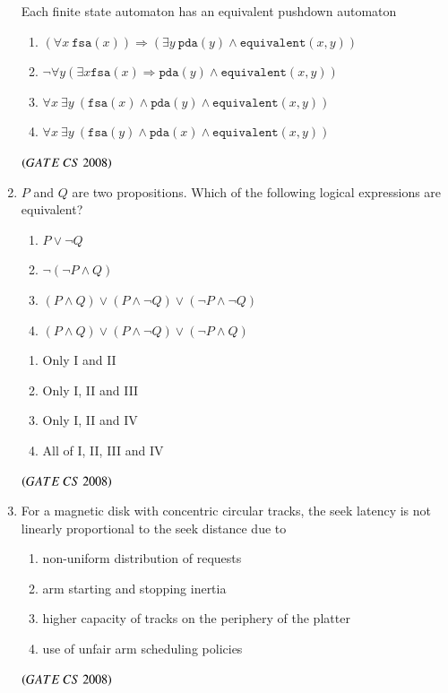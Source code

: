 \documentclass[journal, onecolumn]{IEEEtran}
\numberwithin{equation}{enumi}
\numberwithin{figure}{enumi}
\begin{document}
\begin{enumerate}
Each finite state automaton has an equivalent pushdown automaton

\begin{enumerate}
\item $(\forall x \ \texttt{fsa}(x)) \Rightarrow (\exists y \ \texttt{pda}(y) \land \texttt{equivalent}(x,y))$
\item  $ \neg \forall y  (\exists x  \texttt{fsa}(x) \Rightarrow \texttt{pda}(y) \land \texttt{equivalent}(x,y))$
\item $\forall x \ \exists y \ (\texttt{fsa}(x) \land   \texttt{pda}(y) \land \texttt{equivalent}(x,y))$
\item $\forall x \ \exists y \ (\texttt{fsa}(y) \land \texttt{pda}(x) \land \texttt{equivalent}(x,y))$
\end{enumerate}
\hfill $\left(GATE\ CS\  2008\right)$
\bigskip

\item $P$ and $Q$ are two propositions. Which of the following logical expressions are
equivalent? 
\begin{enumerate} [label=\Roman*.]
   \item \quad $P \lor \neg Q  $  
   \item \quad $\lnot (\neg P \land Q) $  
   \item \quad $(P \land Q) \lor ( P \land \lnot Q) \lor (\neg P \land \neg Q)$  
   \item \quad $(P \land Q) \lor ( P \land \lnot Q) \lor (\neg P \land  Q)$  
\end{enumerate}
\begin{multicols}{2}
\begin{enumerate}
   \item Only I and II
   \item Only I, II and III
   \item Only I, II and IV
   \item All of I, II, III and IV
\bigskip
\end{enumerate}
\end{multicols}
\hfill $\left(GATE\ CS\  2008\right)$

\item For a magnetic disk with concentric circular tracks, the seek latency is not linearly
proportional to the seek distance due to 
\begin{enumerate}
   \item non-uniform distribution of requests
   \item  arm starting and stopping inertia
   \item higher capacity of tracks on the periphery of the platter
   \item use of unfair arm scheduling policies
\end{enumerate}
\hfill $\left(GATE\ CS\  2008\right)$
\bigskip


\end{enumerate}
\end{document}
